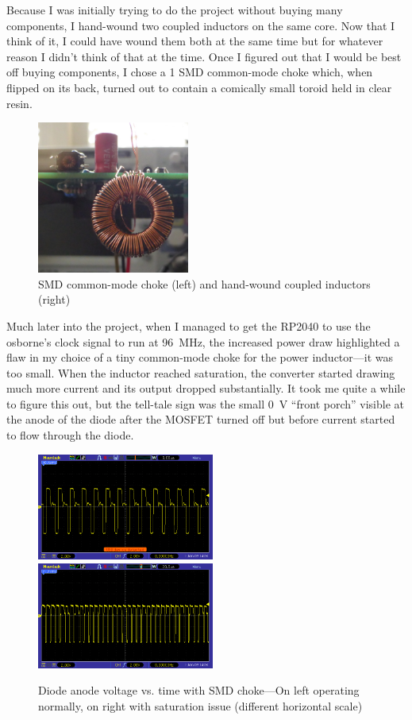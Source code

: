 \documentclass[a4paper]{article}
\begin{document}
Because I was initially trying to do the project without buying many
components, I hand-wound two coupled inductors on the same core. Now
that I think of it, I could have wound them both at the same time but
for whatever reason I didn't think of that at the time. Once I figured
out that I would be best off buying components, I chose a \qty{1}{\uH}
SMD common-mode choke which, when flipped on its back, turned out to
contain a comically small toroid held in clear resin.

\begin{figure}
  \centering
  \includegraphics[height=5cm]{inductors}
  \caption[Inductors]{SMD common-mode choke (left) and hand-wound
    coupled inductors (right)}
\end{figure}


Much later into the project, when I managed to get the RP2040 to use
the osborne's clock signal to run at \qty{96}{\MHz}, the increased
power draw highlighted a flaw in my choice of a tiny common-mode choke
for the power inductor---it was too small. When the inductor reached
saturation, the converter started drawing much more current and its
output dropped substantially. It took me quite a while to figure this
out, but the tell-tale sign was the small \qty{0}{\V} ``front porch''
visible at the anode of the diode after the MOSFET turned off but
before current started to flow through the diode.

\begin{figure}
  \centering
  \includegraphics[height=3.5cm]{pic_23_3}\hfill\includegraphics[height=3.5cm]{pic_23_4}
  \caption[Voltage traces with SMD choke]{Diode anode voltage
    vs. time with SMD choke---On left operating normally, on right
    with saturation issue (different horizontal scale)}
\end{figure}
\end{document}
